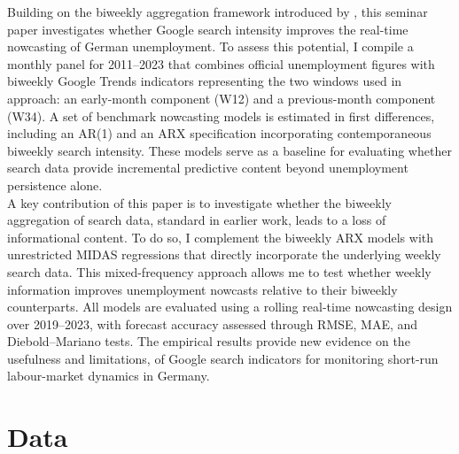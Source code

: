 \documentclass[12pt,a4paper]{article}
\begin{document}
Building on the biweekly aggregation framework introduced by \citet{Askitas}, this seminar paper investigates whether Google search intensity improves the real-time nowcasting of German unemployment.
To assess this potential, I compile a monthly panel for 2011–2023 that combines official unemployment figures with biweekly Google Trends indicators representing the two windows used in \citet{Askitas} approach: an early-month component (W12) and a previous-month component (W34).
A set of benchmark nowcasting models is estimated in first differences, including an AR(1) and an ARX specification incorporating contemporaneous biweekly search intensity. These models serve as a baseline for evaluating whether search data provide incremental predictive content beyond unemployment persistence alone.\\
A key contribution of this paper is to investigate whether the biweekly aggregation of search data, standard in earlier work, leads to a loss of informational content.
To do so, I complement the biweekly ARX models with unrestricted MIDAS regressions that directly incorporate the underlying weekly search data. This mixed-frequency approach allows me to test whether weekly information improves unemployment nowcasts relative to their biweekly counterparts.
All models are evaluated using a rolling real-time nowcasting design over 2019–2023, with forecast accuracy assessed through RMSE, MAE, and Diebold–Mariano tests. The empirical results provide new evidence on the usefulness and limitations, of Google search indicators for monitoring short-run labour-market dynamics in Germany.

\section{Data}
\end{document}

